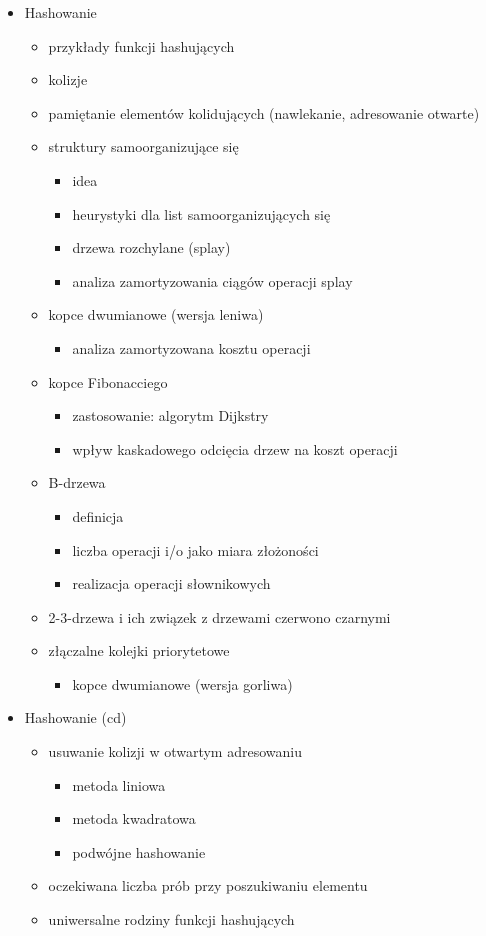 \documentclass[svgnames]{report}
\begin{document}
\begin{itemize}
\item Hashowanie
\begin{itemize}
	\item przykłady funkcji hashujących
	\item kolizje
	\item pamiętanie elementów kolidujących (nawlekanie, adresowanie otwarte)
	\item struktury samoorganizujące się
	\begin{itemize}
		\item idea
		\item heurystyki dla list samoorganizujących się
		\item drzewa rozchylane (splay)
		\item analiza zamortyzowania ciągów operacji splay
	\end{itemize}
	\item kopce dwumianowe (wersja leniwa)
	\begin{itemize}
		\item analiza zamortyzowana kosztu operacji
	\end{itemize}
	\item kopce Fibonacciego
	\begin{itemize}
		\item zastosowanie: algorytm Dijkstry
		\item wpływ kaskadowego odcięcia drzew na koszt operacji
	\end{itemize}
	\item B-drzewa
	\begin{itemize}
		\item definicja
		\item liczba operacji i/o jako miara złożoności
		\item realizacja operacji słownikowych
	\end{itemize}
	\item 2-3-drzewa i ich związek z drzewami czerwono czarnymi
	\item złączalne kolejki priorytetowe
	\begin{itemize}
		\item kopce dwumianowe (wersja gorliwa)
	\end{itemize}
\end{itemize}

\item Hashowanie (cd)
\begin{itemize}
	\item usuwanie kolizji w otwartym adresowaniu
	\begin{itemize}
		\item metoda liniowa
		\item metoda kwadratowa
		\item podwójne hashowanie
	\end{itemize}
	\item oczekiwana liczba prób przy poszukiwaniu elementu
	\item uniwersalne rodziny funkcji hashujących
\end{itemize}


\end{itemize}
\end{document}
